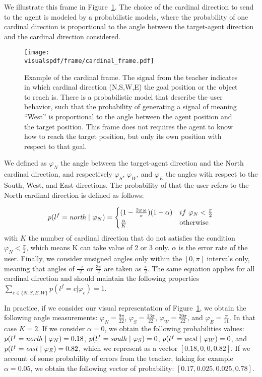 We illustrate this frame in Figure~\ref{fig:cardinalframe}. The choice of the cardinal direction to send to the agent is modeled by a probabilistic models, where the probability of one cardinal direction is proportional to the angle between the target-agent direction and the cardinal direction considered.

\begin{figure}[!ht]
    \centering
    \texttt{[image: \\visualspdf/frame/cardinal\_frame.pdf]}
    \caption{Example of the cardinal frame. The signal from the teacher indicates in which cardinal direction (N,S,W,E) the goal position or the object to reach is. There is a probabilistic model that describe the user behavior, such that the probability of generating a signal of meaning ``West'' is proportional to the angle between the agent position and the target position. This frame does not requires the agent to know how to reach the target position, but only its own position with respect to that goal.}
    \label{fig:cardinalframe}
\end{figure}

We defined as $\varphi_N$ the angle between the target-agent direction and the North cardinal direction, and respectively $\varphi_S$, $\varphi_W$, and $\varphi_E$ the angles with respect to the South, West, and East directions. The probability of that the user refers to the North cardinal direction is defined as follows:

\begin{equation}
    p(l^f = \emph{north}~|~\varphi_N) = 
    \begin{cases}
    (1 - \frac{2 \varphi_N}{\pi}) (1-\alpha) & if~\varphi_N < \frac{\pi}{2}\\
        \frac{\alpha}{K}  & \text{otherwise}\\
   \end{cases}
   \label{eq:cardinalframe}
\end{equation}
with $K$ the number of cardinal direction that do not satisfies the condition $\varphi_N < \frac{\pi}{2}$, which means K can take value of 2 or 3 only. $\alpha$ is the error rate of the user. Finally, we consider unsigned angles only within the $[0, \pi]$ intervals only, meaning that angles of $\frac{-\pi}{2}$ or $\frac{3\pi}{2}$ are taken as $\frac{\pi}{2}$. The same equation applies for all cardinal direction and should maintain the following properties $\sum_{c \in \{N,S,E,W\}} p(l^f = c |\varphi_c) = 1$.

In practice, if we consider our visual representation of Figure~\ref{fig:cardinalframe}, we obtain the following angle measurements: $\varphi_N = \frac{9\pi}{22}$, $\varphi_S = \frac{13\pi}{22}$, $\varphi_W = \frac{20\pi}{22}$, and $\varphi_E = \frac{\pi}{11}$. In that case $K = 2$. If we consider $\alpha = 0$, we obtain the following probabilities values: $p(l^f = \emph{north}~|~\varphi_N) = 0.18$, $p(l^f = \emph{south}~|~\varphi_S) = 0$, $p(l^f = \emph{west}~|~\varphi_W) = 0$, and $p(l^f = \emph{east}~|~\varphi_E) = 0.82$, which we represent as a vector $[0.18,0,0,0.82]$. If we account of some probability of errors from the teacher, taking for example $\alpha = 0.05$, we obtain the following vector of probability: $[0.17, 0.025, 0.025,0.78]$.

